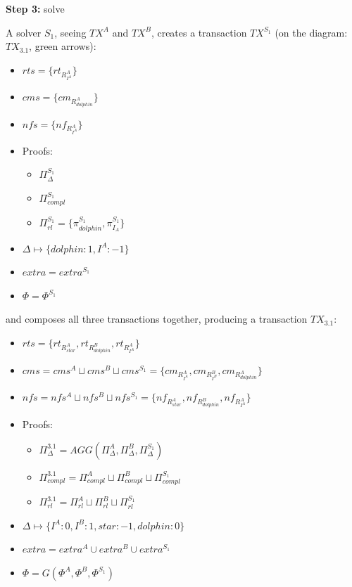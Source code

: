 \documentclass[
    11pt,            %
    techreport,        %
    affiltop,       %
]{art}
\begin{document}
\textbf{Step 3:} solve

A solver $S_1$, seeing $TX^A$ and $TX^B$, creates a transaction $TX^{S_1}$ (on the diagram: $TX_{3.1}$, green arrows):

\begin{itemize}
    \item $rts = \{rt_{R^A_{I^{A}}}\}$
    \item $cms = \{cm_{R^A_{dolphin}}\}$
    \item $nfs = \{nf_{R^A_{I^{A}}}\}$
        \item Proofs:
    \begin{itemize}
        \item $\Pi^{S_1}_{\Delta}$
        \item $\Pi^{S_1}_{compl}$
        \item $\Pi^{S_1}_{rl} = \{\pi^{S_1}_{dolphin}, \pi^{S_1}_{I_A}\}$
    \end{itemize}
    \item $\Delta \mapsto \{dolphin: 1, I^{A}: -1\}$
    \item $extra = extra^{S_1}$
    \item $\Phi = \Phi^{S_1}$
\end{itemize}

and composes all three transactions together, producing a transaction $TX_{3.1}$:

\begin{itemize}
    \item $rts = \{rt_{R^A_{star}}, rt_{R^B_{dolphin}}, rt_{R^A_{I^{A}}}\}$
    \item $cms = cms^{A} \sqcup cms^B \sqcup cms^{S_1} =\{
    cm_{R^A_{I^{A}}}, cm_{R^B_{I^{B}}}, cm_{R^A_{dolphin}}\}$
    \item $nfs = nfs^A \sqcup nfs^B \sqcup nfs^{S_1} = \{nf_{R^A_{star}}, nf_{R^B_{dolphin}}, nf_{R^A_{I^{A}}}\}$
        \item Proofs:
    \begin{itemize}
        \item $\Pi^{3.1}_{\Delta} = AGG(\Pi^A_{\Delta}, \Pi^B_{\Delta}, \Pi^{S_1}_{\Delta})$
        \item $\Pi^{3.1}_{compl} = \Pi^A_{compl} \sqcup \Pi^B_{compl} \sqcup \Pi^{S_1}_{compl}$
        \item $\Pi^{3.1}_{rl} = \Pi^A_{rl} \sqcup \Pi^B_{rl} \sqcup \Pi^{S_1}_{rl}$
    \end{itemize}
    \item $\Delta \mapsto \{I^{A}: 0, I^{B}: 1, star: -1, dolphin: 0\}$
    \item $extra = extra^A \cup extra^B \cup extra^{S_1}$
    \item $\Phi = G(\Phi^A, \Phi^B, \Phi^{S_1})$
\end{itemize}
\end{document}
